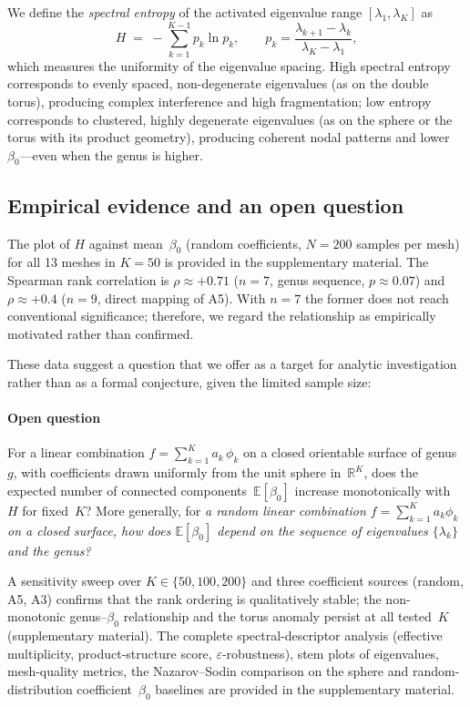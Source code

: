 \documentclass[]{interact}
\theoremstyle{plain}
\theoremstyle{definition}
\theoremstyle{remark}
\begin{document}
We define the \emph{spectral entropy} of the activated eigenvalue range $[\lambda_1,\lambda_K]$ as
\[
  H \;=\; -\sum_{k=1}^{K-1} p_k \ln p_k, \qquad
  p_k = \frac{\lambda_{k+1}-\lambda_k}{\lambda_K - \lambda_1},
\]
which measures the uniformity of the eigenvalue spacing. High spectral entropy corresponds to evenly spaced, non-degenerate eigenvalues (as on the double torus), producing complex interference and high fragmentation; low entropy corresponds to clustered, highly degenerate eigenvalues (as on the sphere or the torus with its product geometry), producing coherent nodal patterns and lower~$\beta_0$---even when the genus is higher.

\subsection{Empirical evidence and an open question}
\label{sec:entropy_evidence}

The plot of $H$ against mean~$\beta_0$ (random coefficients, $N=200$ samples per mesh) for all 13 meshes in $K=50$ is provided in the supplementary material. The Spearman rank correlation is $\rho \approx +0.71$ ($n=7$, genus sequence, $p\approx0.07$) and $\rho \approx +0.4$ ($n=9$, direct mapping of A5). With $n=7$ the former does not reach conventional significance; therefore, we regard the relationship as empirically motivated rather than confirmed.

These data suggest a question that we offer as a target for analytic investigation rather than as a formal conjecture, given the limited sample size:

\paragraph{Open question}
\label{conj:spectral_entropy}
For a linear combination $f = \sum_{k=1}^{K} a_k\,\phi_k$ on a closed orientable surface of genus~$g$, with coefficients drawn uniformly from the unit sphere in~$\mathbb{R}^K$, does the expected number of connected components~$\mathbb{E}[\beta_0]$ increase monotonically with~$H$ for fixed~$K$? More generally, for \emph{a random linear combination $f=\sum_{k=1}^K a_k\phi_k$ on a closed surface, how does $\mathbb{E}[\beta_0]$ depend on the sequence of eigenvalues $\{\lambda_k\}$ and the genus?}

A sensitivity sweep over $K\in\{50,100,200\}$ and three coefficient sources (random, A5, A3) confirms that the rank ordering is qualitatively stable; the non-monotonic genus--$\beta_0$ relationship and the torus anomaly persist at all tested~$K$ (supplementary material). The complete spectral-descriptor analysis (effective multiplicity, product-structure score, $\varepsilon$-robustness), stem plots of eigenvalues, mesh-quality metrics, the Nazarov--Sodin comparison on the sphere and random-distribution coefficient~$\beta_0$ baselines are provided in the supplementary material.
\end{document}
